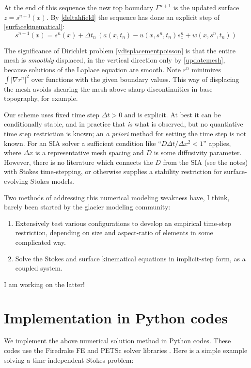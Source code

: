 \documentclass[letterpaper,final,12pt,reqno]{amsart}
\newcommand{\grad}{\nabla}
\begin{document}
\medskip
At the end of this sequence the new top boundary $\Gamma^{n+1}$ is the updated surface $z=s^{n+1}(x)$.  By \eqref{deltahfield} the sequence has done an explicit step of \eqref{surfacekinematical}:
    $$s^{n+1}(x) = s^n(x) + \Delta t_n\,\left(a(x,t_n) - u(x,s^n,t_n) s_x^n + w(x,s^n,t_n)\right)$$

The significance of Dirichlet problem \eqref{vdisplacementpoisson} is that the entire mesh is \emph{smoothly} displaced, in the vertical direction only by \eqref{updatemesh}, because solutions of the Laplace equation are smooth.  Note $r^n$ minimizes $\int |\grad r^n|^2$ over functions with the given boundary values.  This way of displacing the mesh avoids shearing the mesh above sharp discontinuities in base topography, for example.

Our scheme uses fixed time step $\Delta t > 0$ and is explicit.  At best it can be conditionally stable, and in practice that \emph{is} what is observed, but no quantiative time step restriction is known; an \emph{a priori} method for setting the time step is not known.  For an SIA solver a sufficient condition like ``$D\Delta t / \Delta x^2 < 1$'' applies, where $\Delta x$ is a representative mesh spacing and $D$ is some diffusivity parameter.  However, there is no literature which connects the $D$ from the SIA (see the notes) with Stokes time-stepping, or otherwise supplies a stability restriction for surface-evolving Stokes models.

Two methods of addressing this numerical modeling weakness have, I think, barely been started by the glacier modeling community:
\renewcommand{\labelenumi}{(\roman{enumi})}
\begin{enumerate}
\item Extensively test various configurations to develop an empirical time-step restriction, depending on size and aspect-ratio of elements in some complicated way.
\item Solve the Stokes and surface kinematical equations in implicit-step form, as a coupled system.
\end{enumerate}
I am working on the latter!

\section{Implementation in Python codes} \label{sec:implementation}

We implement the above numerical solution method in Python codes.  These codes use the Firedrake FE \cite{Rathgeberetal2016} and PETSc solver libraries \cite{Balayetal2018,Bueler2021}.  Here is a simple example solving a time-independent Stokes problem:
\end{document}
